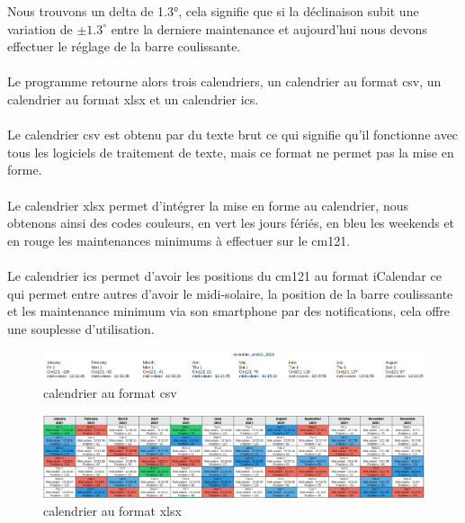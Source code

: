 \documentclass[12pt,a4paper]{article}
\begin{document}
\begin{flushleft}
Nous trouvons un delta de 1.3°, cela signifie que si la déclinaison subit une variation de $\pm 1.3^\circ$ entre la derniere maintenance et aujourd'hui nous devons effectuer le réglage de la barre coulissante.\\
~\\
Le programme retourne alors trois calendriers, un calendrier au format csv, un calendrier au format xlsx et un calendrier ics. \\
~\\
Le calendrier csv est obtenu par du texte brut ce qui signifie qu'il fonctionne avec tous les logiciels de traitement de texte, mais ce format ne permet pas la mise en forme. \\
~\\
Le calendrier xlsx permet d'intégrer la mise en forme au calendrier, nous obtenons ainsi des codes couleurs, en vert les jours fériés, en bleu les weekends et en rouge les maintenances minimums à effectuer sur le cm121. \\
~\\
Le calendrier ics permet d'avoir les positions du cm121 au format iCalendar ce qui permet entre autres d'avoir le midi-solaire, la position de la barre coulissante et les maintenance minimum via son smartphone par des notifications, cela offre une souplesse d'utilisation.\\

\begin{figure}[H]
\centering
\includegraphics[width=16cm]{image/calendrier/3.PNG} 
\caption{calendrier au format csv}  
\end{figure}

\begin{figure}[H]
\centering
\includegraphics[width=16cm]{image/calendrier/2.PNG} 
\caption{calendrier au format xlsx}  
\end{figure}



\end{flushleft}
\end{document}
